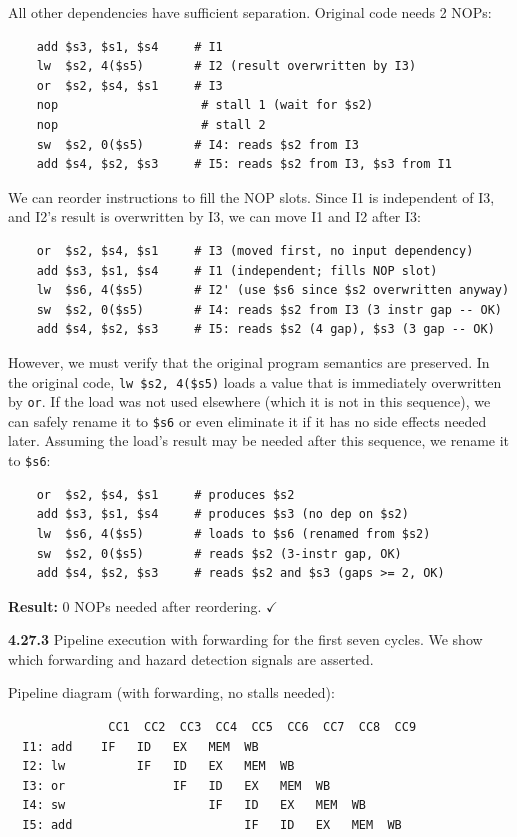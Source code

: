 All other dependencies have sufficient separation. Original code needs 2 NOPs:
\begin{verbatim}
    add $s3, $s1, $s4     # I1
    lw  $s2, 4($s5)       # I2 (result overwritten by I3)
    or  $s2, $s4, $s1     # I3
    nop                    # stall 1 (wait for $s2)
    nop                    # stall 2
    sw  $s2, 0($s5)       # I4: reads $s2 from I3
    add $s4, $s2, $s3     # I5: reads $s2 from I3, $s3 from I1
\end{verbatim}

We can reorder instructions to fill the NOP slots. Since I1 is independent of
I3, and I2's result is overwritten by I3, we can move I1 and I2 after I3:
\begin{verbatim}
    or  $s2, $s4, $s1     # I3 (moved first, no input dependency)
    add $s3, $s1, $s4     # I1 (independent; fills NOP slot)
    lw  $s6, 4($s5)       # I2' (use $s6 since $s2 overwritten anyway)
    sw  $s2, 0($s5)       # I4: reads $s2 from I3 (3 instr gap -- OK)
    add $s4, $s2, $s3     # I5: reads $s2 (4 gap), $s3 (3 gap -- OK)
\end{verbatim}

However, we must verify that the original program semantics are preserved. In
the original code, \texttt{lw \$s2, 4(\$s5)} loads a value that is immediately
overwritten by \texttt{or}. If the load was not used elsewhere (which it is not
in this sequence), we can safely rename it to \texttt{\$s6} or even eliminate
it if it has no side effects needed later. Assuming the load's result may be
needed after this sequence, we rename it to \texttt{\$s6}:

\begin{verbatim}
    or  $s2, $s4, $s1     # produces $s2
    add $s3, $s1, $s4     # produces $s3 (no dep on $s2)
    lw  $s6, 4($s5)       # loads to $s6 (renamed from $s2)
    sw  $s2, 0($s5)       # reads $s2 (3-instr gap, OK)
    add $s4, $s2, $s3     # reads $s2 and $s3 (gaps >= 2, OK)
\end{verbatim}

\textbf{Result:} 0 NOPs needed after reordering. $\checkmark$

\medskip\noindent\textbf{4.27.3}
Pipeline execution with forwarding for the first seven cycles. We show which
forwarding and hazard detection signals are asserted.

Pipeline diagram (with forwarding, no stalls needed):
\begin{verbatim}
              CC1  CC2  CC3  CC4  CC5  CC6  CC7  CC8  CC9
  I1: add    IF   ID   EX   MEM  WB
  I2: lw          IF   ID   EX   MEM  WB
  I3: or               IF   ID   EX   MEM  WB
  I4: sw                    IF   ID   EX   MEM  WB
  I5: add                        IF   ID   EX   MEM  WB
\end{verbatim}

